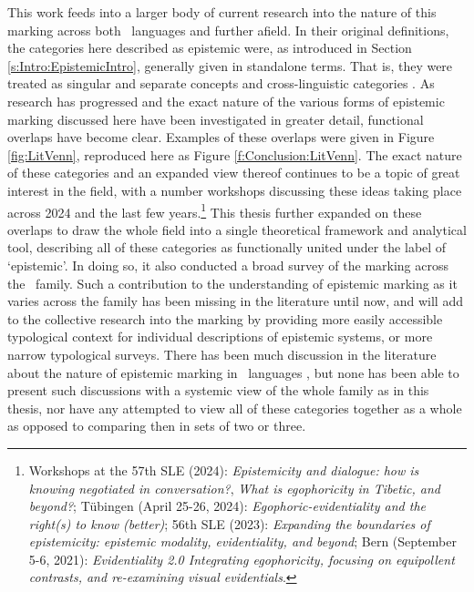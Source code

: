 This work feeds into a larger body of current research into the nature of this marking across both \lfam\ languages and further afield. In their original definitions, the categories here described as epistemic were, as introduced in Section \ref{s:Intro:EpistemicIntro}, generally given in standalone terms. That is, they were treated as singular and separate concepts and cross-linguistic categories \cites{ChafeNichols1986}{DeLanceyMirativity1997}{Tournadre1992}{EvansBergqvistSanRoque2018a}. As research has progressed and the exact nature of the various forms of epistemic marking discussed here have been investigated in greater detail, functional overlaps have become clear. Examples of these overlaps were given in Figure \ref{fig:LitVenn}, reproduced here as Figure \ref{f:Conclusion:LitVenn}. The exact nature of these categories and an expanded view thereof continues to be a topic of great interest in the field, with a number workshops discussing these ideas taking place across 2024 and the last few years.\footnote{Workshops at the 57th SLE (2024): \textit{Epistemicity and dialogue: how is knowing negotiated in conversation?}, \textit{What is egophoricity in Tibetic, and beyond?}; Tübingen (April 25-26, 2024): \textit{Egophoric-evidentiality and the right(s) to know (better)}; 56th SLE (2023): \textit{Expanding the boundaries of epistemicity: epistemic modality, evidentiality, and beyond}; Bern (September 5-6, 2021): \textit{Evidentiality 2.0 Integrating egophoricity, focusing on equipollent contrasts, and re-examining visual evidentials}.} This thesis further expanded on these overlaps to draw the whole field into a single theoretical framework and analytical tool, describing all of these categories as functionally united under the label of `epistemic'. In doing so, it also conducted a broad survey of the marking across the \lfam\ family. Such a contribution to the understanding of epistemic marking as it varies across the family has been missing in the literature until now, and will add to the collective research into the marking by providing more easily accessible typological context for individual descriptions of epistemic systems, or more narrow typological surveys. There has been much discussion in the literature about the nature of epistemic marking in \lfam\ languages \cites{Bergqvist2020a}{DeLancey2012}{Gawne2017}{HengeveldOlbertz2012}{Hill2012}{Hyslop2014}{Hyslop2018}{Widmer2017}{Widmer2020}, but none has been able to present such discussions with a systemic view of the whole family as in this thesis, nor have any attempted to view all of these categories together as a whole as opposed to comparing then in sets of two or three.

